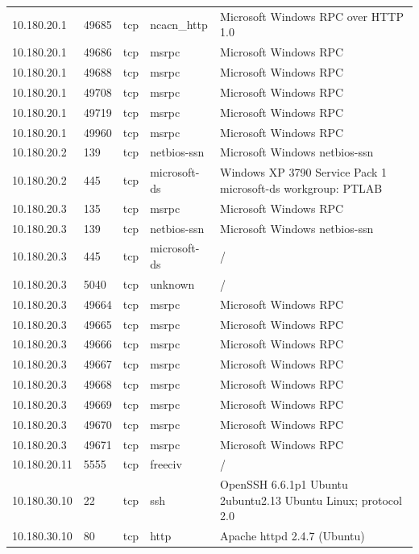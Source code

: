 \documentclass[french,paper=a4,oneside,captions=tableheading]{article}
\begin{document}
\begin{center}
\begin{longtable}{llllp{8.5cm}}
    10.180.20.1  & 49685 & tcp & ncacn\_http  & Microsoft Windows RPC over HTTP 1.0 \\
    10.180.20.1  & 49686 & tcp & msrpc        & Microsoft Windows RPC \\
    10.180.20.1  & 49688 & tcp & msrpc        & Microsoft Windows RPC \\
    10.180.20.1  & 49708 & tcp & msrpc        & Microsoft Windows RPC \\
    10.180.20.1  & 49719 & tcp & msrpc        & Microsoft Windows RPC \\
    10.180.20.1  & 49960 & tcp & msrpc        & Microsoft Windows RPC \\
    10.180.20.2  & 139   & tcp & netbios-ssn  & Microsoft Windows netbios-ssn \\
    10.180.20.2  & 445   & tcp & microsoft-ds & Windows XP 3790 Service Pack 1 microsoft-ds workgroup: PTLAB \\
    10.180.20.3  & 135   & tcp & msrpc        & Microsoft Windows RPC \\
    10.180.20.3  & 139   & tcp & netbios-ssn  & Microsoft Windows netbios-ssn \\
    10.180.20.3  & 445   & tcp & microsoft-ds & / \\
    10.180.20.3  & 5040  & tcp & unknown      & / \\
    10.180.20.3  & 49664 & tcp & msrpc        & Microsoft Windows RPC \\
    10.180.20.3  & 49665 & tcp & msrpc        & Microsoft Windows RPC \\
    10.180.20.3  & 49666 & tcp & msrpc        & Microsoft Windows RPC \\
    10.180.20.3  & 49667 & tcp & msrpc        & Microsoft Windows RPC \\
    10.180.20.3  & 49668 & tcp & msrpc        & Microsoft Windows RPC \\
    10.180.20.3  & 49669 & tcp & msrpc        & Microsoft Windows RPC \\
    10.180.20.3  & 49670 & tcp & msrpc        & Microsoft Windows RPC \\
    10.180.20.3  & 49671 & tcp & msrpc        & Microsoft Windows RPC \\
    10.180.20.11 & 5555  & tcp & freeciv      & / \\
    10.180.30.10 & 22    & tcp & ssh          & OpenSSH 6.6.1p1 Ubuntu 2ubuntu2.13 Ubuntu Linux; protocol 2.0 \\
    10.180.30.10 & 80    & tcp & http         & Apache httpd 2.4.7 (Ubuntu) \\

\end{longtable}
\end{center}
\end{document}
